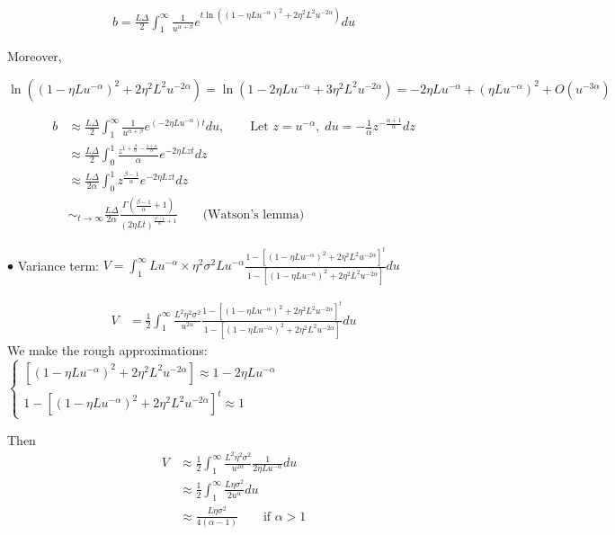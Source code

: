 \documentclass{article}
\begin{document}
\begin{align*}
b= \frac{L\Delta}{2} \int_1^\infty \frac{1}{u^{\alpha+\beta} }e^{t \ln((1-\eta L u^{-\alpha})^2+2\eta^2 L^2 u^{-2\alpha})}  du
\end{align*}

Moreover, 

$\ln((1-\eta L u^{-\alpha})^2+2\eta^2 L^2 u^{-2\alpha}) =  \ln(1 -2\eta L u^{-\alpha}+3\eta^2 L^2 u^{-2\alpha}) = -2\eta L u^{-\alpha} +(\eta Lu^{-\alpha})^2 + O(u^{-3\alpha})$

\begin{align*}
b &\approx \frac{L\Delta}{2} \int_1^\infty \frac{1}{u^{\alpha+\beta} }e^{  (-2\eta L u^{-\alpha} )t}  du, \qquad \text{Let }z=u^{-\alpha},\; du =-\frac{1}{\alpha}z^{-\frac{\alpha+1}{\alpha}}dz\\
&\approx \frac{L\Delta}{2} \int_0^1 \frac{z^{1+\frac{\beta}{\alpha}-\frac{1+\alpha}{\alpha}}}{\alpha }e^{  -2\eta Lz t}  dz\\
&\approx \frac{L\Delta}{2\alpha} \int_0^1 z^{\frac{\beta-1}{\alpha}}e^{  -2\eta Lz t}  dz\\
&\sim_{t\to \infty} \frac{L\Delta}{2\alpha} \frac{\Gamma(\frac{\beta-1}{\alpha}+1)}{(2\eta L t)^{\frac{\beta-1}{\alpha}+1}} \qquad \text{(Watson's lemma)}
\end{align*}


$\bullet$ Variance term: $V = \int_{1}^\infty L u^{-\alpha}\times \eta^2\sigma^2Lu^{-\alpha} \frac{1 - \left[(1-\eta Lu^{-\alpha})^2+2\eta^2L^2u^{-2\alpha}\right]^t}{1 - \left[(1-\eta Lu^{-\alpha})^2+2\eta^2L^2u^{-2\alpha}\right]}du$

\begin{align*}
V &= \frac{1}{2} \int_{1}^\infty \frac{L^2 \eta^2\sigma^2}{u^{2\alpha}} \frac{1 - \left[(1-\eta Lu^{-\alpha})^2+2\eta^2L^2u^{-2\alpha}\right]^t}{1 - \left[(1-\eta Lu^{-\alpha})^2+2\eta^2L^2u^{-2\alpha}\right]}du
\end{align*}
We make the rough approximations:
$\left\{
\begin{array}{l}
 \left[(1-\eta Lu^{-\alpha})^2+2\eta^2L^2u^{-2\alpha}\right] \approx 1 - 2\eta L u^{-\alpha}\\
 1-\left[(1-\eta Lu^{-\alpha})^2+2\eta^2L^2u^{-2\alpha}\right]^{t} \approx 1
\end{array}
\right.$

Then
\begin{align*}
V&\approx \frac{1}{2}  \int_{1}^\infty \frac{L^2 \eta^2\sigma^2}{u^{2\alpha}} \frac{1 }{ 2\eta Lu^{-\alpha}}du\\
&\approx \frac{1}{2} \int_{1}^\infty \frac{L \eta\sigma^2}{2u^{\alpha}} du\\
&\approx \frac{L \eta\sigma^2}{4(\alpha-1)} \qquad \text{if } \alpha>1
\end{align*}
\end{document}
